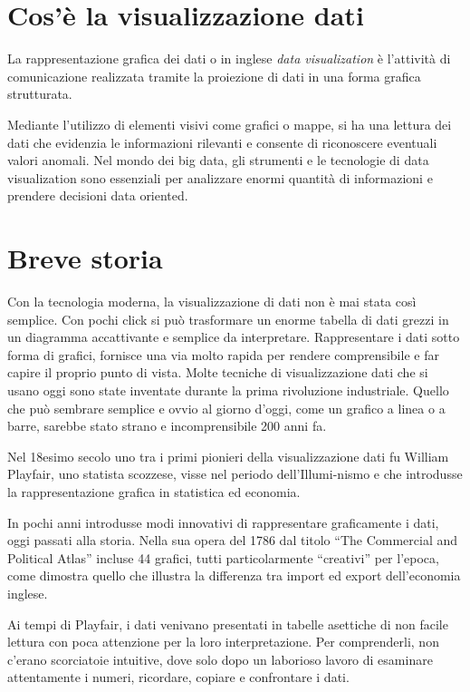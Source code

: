 
\section{Cos'è la visualizzazione dati}
La rappresentazione grafica dei dati o in inglese \emph{data visualization} è l’attività di comunicazione realizzata tramite la proiezione di dati in una forma grafica strutturata.

Mediante l’utilizzo di elementi visivi come grafici o mappe, si ha una lettura dei dati che evidenzia le informazioni rilevanti e consente di riconoscere eventuali valori anomali.
Nel mondo dei big data, gli strumenti e le tecnologie di data visualization sono essenziali per analizzare enormi quantità di informazioni e prendere decisioni data oriented.


\section{Breve storia}

Con la tecnologia moderna, la visualizzazione di dati non è mai stata così semplice.
Con pochi click si può trasformare un enorme tabella di dati grezzi in un diagramma accattivante e semplice da interpretare.
Rappresentare i dati sotto forma di grafici, fornisce una via molto rapida per rendere comprensibile e far capire il proprio punto di vista.
Molte tecniche di visualizzazione dati che si usano oggi sono state inventate durante la prima rivoluzione industriale.
Quello che può sembrare semplice e ovvio al giorno d’oggi, come un grafico a linea o a barre, sarebbe stato strano e incomprensibile 200 anni fa.

Nel 18esimo secolo uno tra i primi pionieri della visualizzazione dati fu William Playfair, uno statista scozzese, visse nel periodo dell’Illumi\hyp{nismo} e che introdusse la rappresentazione grafica in statistica ed economia.

In pochi anni introdusse modi innovativi di rappresentare graficamente i dati, oggi passati alla storia. Nella sua opera del 1786 dal titolo “The Commercial and Political Atlas” incluse 44 grafici, tutti particolarmente “creativi” per l’epoca, come dimostra quello che illustra la differenza tra import ed export dell’economia inglese.

Ai tempi di Playfair, i dati venivano presentati in tabelle asettiche di non facile lettura con poca attenzione per la loro interpretazione. Per comprenderli, non c’erano scorciatoie intuitive, dove solo dopo un laborioso lavoro di esaminare attentamente i numeri, ricordare, copiare e confrontare i dati.

